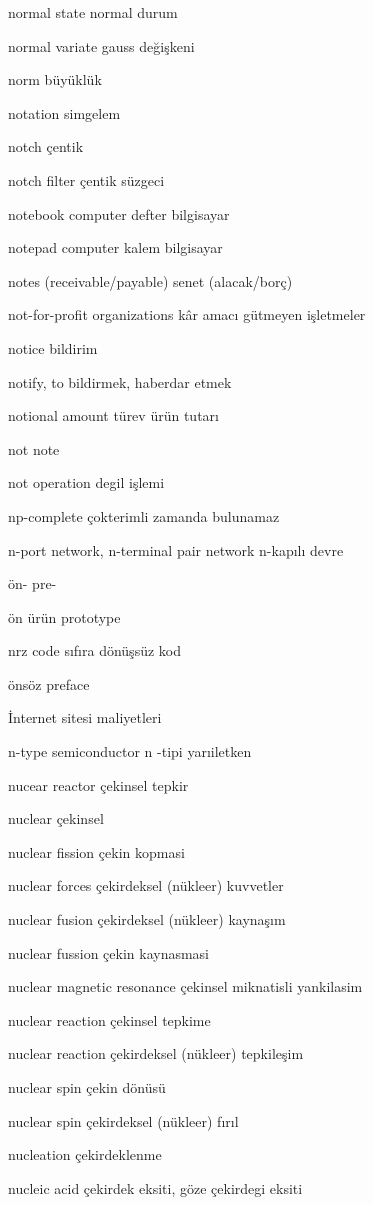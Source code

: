 \documentclass[12pt,fleqn]{article}\usepackage{../../common}
\begin{document}
normal state normal durum

normal variate gauss değişkeni

norm büyüklük

notation simgelem

notch çentik

notch filter çentik süzgeci

notebook computer defter bilgisayar

notepad computer kalem bilgisayar

notes (receivable/payable) senet (alacak/borç)

not-for-profit organizations kâr amacı gütmeyen işletmeler

notice bildirim

notify, to bildirmek, haberdar etmek

notional amount türev ürün tutarı

not note

not operation degil işlemi

np-complete çokterimli zamanda bulunamaz

n-port network, n-terminal pair network n-kapılı devre

ön- pre-

ön ürün prototype

nrz code sıfıra dönüşsüz kod

önsöz preface

İnternet sitesi maliyetleri

n-type semiconductor n -tipi yarıiletken

nucear reactor çekinsel tepkir

nuclear çekinsel

nuclear fission çekin kopmasi

nuclear forces çekirdeksel (nükleer) kuvvetler

nuclear fusion çekirdeksel (nükleer) kaynaşım

nuclear fussion çekin kaynasmasi

nuclear magnetic resonance çekinsel miknatisli yankilasim

nuclear reaction çekinsel tepkime

nuclear reaction çekirdeksel (nükleer) tepkileşim

nuclear spin çekin dönüsü

nuclear spin çekirdeksel (nükleer) fırıl

nucleation çekirdeklenme

nucleic acid çekirdek eksiti, göze çekirdegi eksiti
\end{document}
